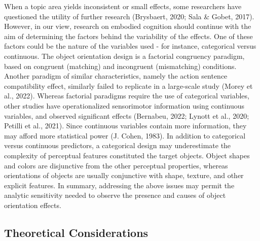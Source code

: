 \documentclass[
  man,floatsintext]{apa7}
\begin{document}
When a topic area yields inconsistent or small effects, some researchers
have questioned the utility of further research (Brysbaert, 2020; Sala \& Gobet, 2017). However, in our view, research on embodied cognition should
continue with the aim of determining the factors behind the variability
of the effects. One of these factors could be the nature of the
variables used - for instance, categorical versus continuous. The object
orientation design is a factorial congruency paradigm, based on
congruent (matching) and incongruent (mismatching) conditions. Another
paradigm of similar characteristics, namely the action sentence
compatibility effect, similarly failed to replicate in a large-scale
study (Morey et al., 2022). Whereas factorial paradigms require the use of
categorical variables, other studies have operationalized sensorimotor
information using continuous variables, and observed significant effects
(Bernabeu, 2022; Lynott et al., 2020; Petilli et al., 2021). Since continuous variables
contain more information, they may afford more statistical power
(J. Cohen, 1983). In addition to categorical versus continuous predictors, a
categorical design may underestimate the complexity of perceptual
features constituted the target objects. Object shapes and colors are
disjunctive from the other perceptual properties, whereas orientations
of objects are usually conjunctive with shape, texture, and other
explicit features. In summary, addressing the above issues may permit
the analytic sensitivity needed to observe the presence and causes of
object orientation effects.

\hypertarget{theoretical-considerations}{%
\subsection{Theoretical Considerations}\label{theoretical-considerations}}
\end{document}
